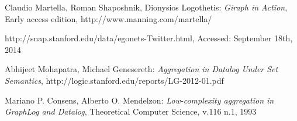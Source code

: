 \begin{thebibliography}{99}
 Claudio Martella, Roman Shaposhnik, Dionysios Logothetis: \textit{Giraph in Action}, Early access edition, http://www.manning.com/martella/

 http://snap.stanford.edu/data/egonets-Twitter.html, Accessed: September 18th, 2014 

 Abhijeet Mohapatra, Michael Genesereth: \textit{Aggregation in Datalog Under Set Semantics}, http://logic.stanford.edu/reports/LG-2012-01.pdf

 Mariano P. Consens, Alberto O. Mendelzon: \textit{Low-complexity aggregation in GraphLog and Datalog}, Theoretical Computer Science, v.116 n.1, 1993

\end{thebibliography}

